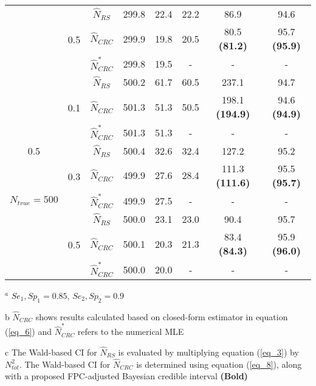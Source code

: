 \documentclass[useAMS,usenatbib,referee]{biom}
\begin{document}
\begin{table}
\begin{threeparttable}[b]
\begin{tabular}{|c|c|c|c|c|c|c|c|}
     & \multirow{3}{*}{0.5}  & $\hat{N}_{RS}$ & 299.8 & 22.4 & 22.2 & 86.9 & 94.6    \\ \cline{3-8}
     & ~ & $\hat{N}_{CRC}$ & 299.9 & 19.8 & 20.5 & 80.5 \textbf{(81.2)} & 95.7 \textbf{(95.9)}   \\ \cline{3-8}
    ~ & ~ & $\hat{N}_{CRC}^*$ & 299.8 & 19.5  & - & - & -   \\ \hline
    
    & \multirow{3}{*}{0.1} & $\hat{N}_{RS}$ & 500.2 & 61.7 & 60.5 & 237.1 & 94.7  \\ \cline{3-8}
     & ~ & $\hat{N}_{CRC}$ &  501.3 & 51.3 & 50.5 & 198.1 \textbf{(194.9)} & 94.6 \textbf{(94.9)}  \\ \cline{3-8}
    ~ & ~ & $\hat{N}_{CRC}^*$ & 501.3 & 51.3 & - & - & -   \\ \cline{2-8}
    
    0.5 & \multirow{3}{*}{0.3}  & $\hat{N}_{RS}$ & 500.4 & 32.6 & 32.4 & 127.2 & 95.2  \\ \cline{3-8}
     & ~ & $\hat{N}_{CRC}$ &  499.9 & 27.6 & 28.4 & 111.3 \textbf{(111.6)} & 95.5 \textbf{(95.7)}  \\ \cline{3-8}
     $N_{true}=500$ & ~ & $\hat{N}_{CRC}^*$ & 499.9 & 27.5 & - & - & -   \\ \cline{2-8}
    
     & \multirow{3}{*}{0.5}  & $\hat{N}_{RS}$ & 500.0 & 23.1 & 23.0 & 90.4 & 95.7   \\ \cline{3-8}
     & ~ & $\hat{N}_{CRC}$ & 500.1 & 20.3 & 21.3 & 83.4 \textbf{(84.3)} & 95.9 \textbf{(96.0)}   \\ \cline{3-8}
    ~ & ~ & $\hat{N}_{CRC}^*$ &  500.0 & 20.0   & - & - & -   \\ \hline
    \end{tabular}
    \begin{tablenotes}
        \item[$^a$] \footnotesize $Se_1, Sp_1=0.85$, $Se_2, Sp_2=0.9$
        \item[b] \footnotesize $\hat{N}_{CRC}$ shows results calculated based on closed-form estimator in equation (\ref{eq_6}) and $\hat{N}_{CRC}^*$ refers to the numerical MLE
        \item[c] The Wald-based CI for $\hat{N}_{RS}$ is evaluated by multiplying equation (\ref{eq_3}) by $N_{tot}^2$. The Wald-based CI for $\hat{N}_{CRC}$ is determined using equation (\ref{eq_8}), along with a proposed FPC-adjusted Bayesian credible interval \textbf{(Bold)}
  \end{tablenotes}
    \end{threeparttable}
\end{table}
\end{document}
